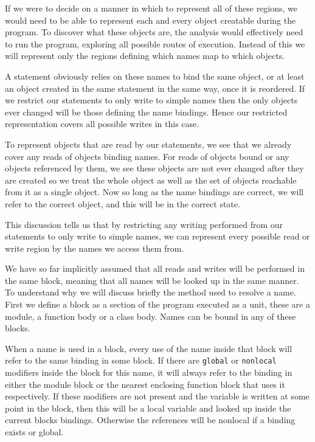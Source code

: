\documentclass{report}
\begin{document}
If we were to decide on a manner in which to represent all of these regions, we would need to be able to represent each and every object creatable during the
program. To discover what these objects are, the analysis would effectively need to run the program, exploring all possible routes of execution. Instead of this
we will represent only the regions defining which names map to which objects.

A statement obviously relies on these names to bind the same object, or at least an object created in the same statement in the same way, once it is reordered.
If we restrict our statements to only write to simple names then the only objects ever changed will be those defining the name bindings. Hence our restricted
representation covers all possible writes in this case.

To represent objects that are read by our statements, we see that we already cover any reads of objects binding names. For reads of objects bound or any objects
referenced by them, we see these objects are not ever changed after they are created so we treat the whole object as well as the set of objects reachable from
it as a single object. Now so long as the name bindings are correct, we will refer to the correct object, and this will be in the correct state.

This discussion tells us that by restricting any writing performed from our statements to only write to simple names, we can represent every possible read or
write region by the names we access them from.

We have so far implicitly assumed that all reads and writes will be performed in the same block, meaning that all names will be looked up in the same manner. To
understand why we will discuss briefly the method used to resolve a name. First we define a block as a section of the program executed as a unit, these are a
module, a function body or a class body. Names can be bound in any of these blocks.

When a name is used in a block, every use of the name inside that block will refer to the same binding in some block. If there are \texttt{global} or
\texttt{nonlocal} modifiers inside the block for this name, it will always refer to the binding in either the module block or the nearest enclosing
function block that uses it respectively. If these modifiers are not present and the variable is written at some point in the block, then this will
be a local variable and looked up inside the current blocks bindings. Otherwise the references will be nonlocal if a binding exists or global.
\end{document}
